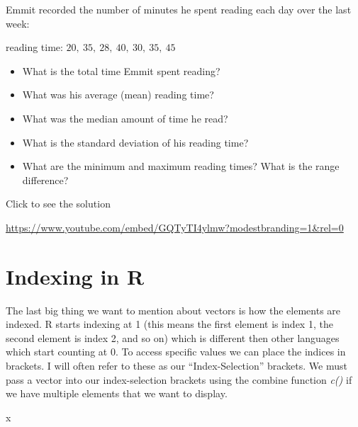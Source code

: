\documentclass[
  letterpaper,
  DIV=11,
  numbers=noendperiod]{scrreprt}
\newenvironment{Shaded}{\begin{snugshade}}{\end{snugshade}}
\newcommand{\NormalTok}[1]{\textcolor[rgb]{0.00,0.23,0.31}{#1}}
\providecommand{\tightlist}{%
  \setlength{\itemsep}{0pt}\setlength{\parskip}{0pt}}
\begin{document}
\begin{tcolorbox}[enhanced jigsaw, leftrule=.75mm, arc=.35mm, coltitle=black, rightrule=.15mm, bottomrule=.15mm, toprule=.15mm, left=2mm, colbacktitle=quarto-callout-tip-color!10!white, title=\textcolor{quarto-callout-tip-color}{\faLightbulb}\hspace{0.5em}{Try it Out}, toptitle=1mm, breakable, colframe=quarto-callout-tip-color-frame, bottomtitle=1mm, titlerule=0mm, colback=white, opacityback=0, opacitybacktitle=0.6]

Emmit recorded the number of minutes he spent reading each day over the
last week:

reading time: \(20,\ 35,\ 28,\ 40,\ 30,\ 35,\ 45\)

\begin{itemize}
\tightlist
\item
  What is the total time Emmit spent reading?
\item
  What was his average (mean) reading time?
\item
  What was the median amount of time he read?
\item
  What is the standard deviation of his reading time?
\item
  What are the minimum and maximum reading times? What is the range
  difference?
\end{itemize}

Click to see the solution

\url{https://www.youtube.com/embed/GQTyTI4ylmw?modestbranding=1&rel=0}

\end{tcolorbox}

\section{Indexing in R}\label{indexing-in-r}

The last big thing we want to mention about vectors is how the elements
are indexed. R starts indexing at 1 (this means the first element is
index 1, the second element is index 2, and so on) which is different
then other languages which start counting at 0. To access specific
values we can place the indices in brackets. I will often refer to these
as our ``Index-Selection'' brackets. We must pass a vector into our
index-selection brackets using the combine function \emph{c()} if we
have multiple elements that we want to display.

\begin{Shaded}
\begin{Highlighting}[]
\NormalTok{x}
\end{Highlighting}
\end{Shaded}
\end{document}
